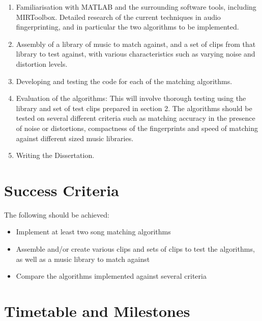 \documentclass[12pt]{article}
\begin{document}
\begin{enumerate}

\item Familiarisation with MATLAB and the surrounding software tools, including MIRToolbox. Detailed research of the current techniques in audio fingerprinting, and in particular the two algorithms to be implemented. 

\item Assembly of a library of music to match against, and a set of clips from that library to test against, with various characteristics such as varying noise and distortion levels.

\item Developing and testing the code for each of the matching algorithms.

\item Evaluation of the algorithms: This will involve thorough testing using the library and set of test clips prepared in section 2. The algorithms should be tested on several different criteria such as matching accuracy in the presence of noise or distortions, compactness of the fingerprints and speed of matching against different sized music libraries.

\item Writing the Dissertation.

\end{enumerate}


\section*{Success Criteria}

The following should be achieved:

\begin{itemize}

\item Implement at least two song matching algorithms

\item Assemble and/or create various clips and sets of clips to test the algorithms, as well as a music library to match against

\item Compare the algorithms implemented against several criteria

\end{itemize}


\newpage %

\section*{Timetable and Milestones}
\end{document}
